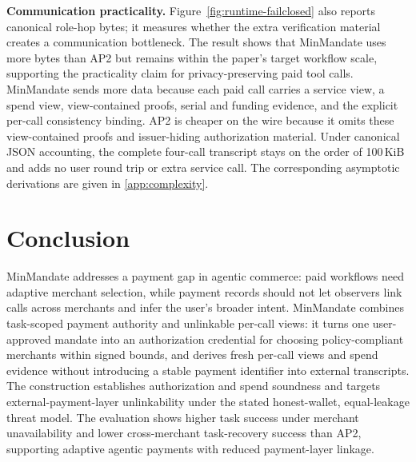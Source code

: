 \documentclass[letterpaper]{article}
\newcommand{\system}{MinMandate\xspace}
\begin{document}
\textbf{Communication practicality.}
Figure~\ref{fig:runtime-failclosed} also reports canonical role-hop bytes; it
measures whether the extra verification material creates a communication
bottleneck. The result shows that \system uses more bytes than AP2 but remains
within the paper's target workflow scale, supporting the practicality claim for
privacy-preserving paid tool calls. \system sends more data because each
paid call carries a service view, a spend view, view-contained proofs,
serial and funding evidence, and the explicit per-call consistency binding.
AP2 is cheaper on the wire because it omits these view-contained proofs and
issuer-hiding authorization material. Under canonical JSON accounting, the
complete four-call transcript stays on the order of 100\,KiB and adds no user
round trip or extra service call.
The corresponding asymptotic derivations are given in
\cref{app:complexity}.

\section{Conclusion}

\system addresses a payment gap in agentic commerce: paid workflows need
adaptive merchant selection, while payment records should not let observers
link calls across merchants and infer the user's broader intent. \system
combines task-scoped payment authority and unlinkable per-call views: it
turns one user-approved mandate into an authorization credential for choosing
policy-compliant merchants within signed bounds, and derives fresh per-call
views and spend evidence without introducing a stable payment identifier into
external transcripts. The construction establishes authorization and spend
soundness and targets external-payment-layer unlinkability under the stated
honest-wallet, equal-leakage threat model. The
evaluation shows higher task success under merchant unavailability and lower
cross-merchant task-recovery success than AP2, supporting adaptive agentic
payments with reduced payment-layer linkage.
\end{document}
